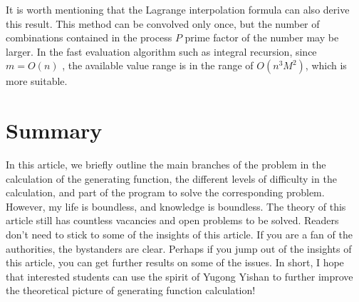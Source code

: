 It is worth mentioning that the Lagrange interpolation formula can also derive this result. This method can be convolved only once, but the number of combinations contained in the process $ P $ prime factor of the number may be larger. In the fast evaluation algorithm such as integral recursion, since $ m=O(n) $ , the available value range is in the range of $ O(n^ 3 M^ 2 ) $, which is more suitable.








\section { Summary }

In this article, we briefly outline the main branches of the problem in the calculation of the generating function, the different levels of difficulty in the calculation, and part of the program to solve the corresponding problem. However, my life is boundless, and knowledge is boundless. The theory of this article still has countless vacancies and open problems to be solved. Readers don't need to stick to some of the insights of this article. If you are a fan of the authorities, the bystanders are clear. Perhaps if you jump out of the insights of this article, you can get further results on some of the issues. In short, I hope that interested students can use the spirit of Yugong Yishan to further improve the theoretical picture of generating function calculation!


